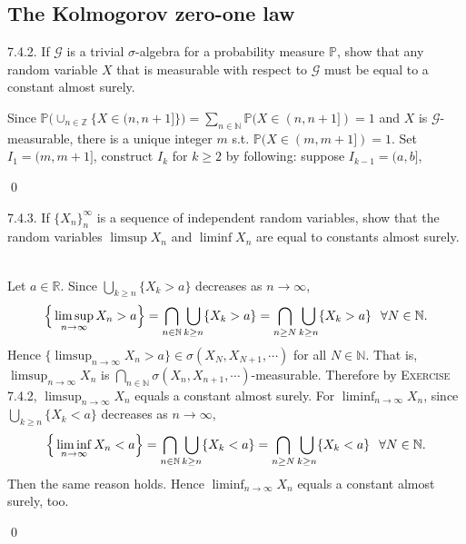 \subsection{The Kolmogorov zero-one law}
\begin{exercise}7.4.2.
If $\mathcal{G}$ is a trivial $\sigma$-algebra for a probability measure $\mathbb{P}$, show that any random variable $X$ that is measurable with respect to $\mathcal{G}$ must be equal to a constant almost surely.
\end{exercise} 
\begin{answer}Since $\mathbb{P}\big(\cup_{n\in\mathbb{Z}}\{X\in(n,n+1]\}\big)=\sum_{n\in\mathbb{N}}\mathbb{P}(X\in(n,n+1])=1$ and $X$ is $\mathcal{G}$-measurable, there is a unique integer $m$ s.t. $\mathbb{P}(X\in(m,m+1])=1$. Set $I_1=(m,m+1]$, construct $I_k$ for $k\geq 2$ by following: suppose $I_{k-1}=(a,b]$,  

\end{answer}\qed \qquad
\begin{exercise}7.4.3.
 If $\{ X_n\}_n^\infty$ is a sequence of independent random variables, show that the random variables $\limsup X_n$ and $\liminf X_n$ are equal to constants almost surely.
\end{exercise}
\begin{answer} \\
Let $a\in\mathbb{R}$. Since $\bigcup_{k\geq n}\{X_k>a\}$ decreases as $n\rightarrow\infty$,
\begin{equation*}
    \begin{aligned}
        \Big\{\limsup_{n\rightarrow\infty}X_n>a\Big\}=\bigcap_{n\in\mathbb{N}}\bigcup_{k\geq n}\{X_k>a\}=\bigcap_{n\geq N}\bigcup_{k\geq n}\{X_k>a\}\hspace{0.25cm}\forall N\in\mathbb{N}.
    \end{aligned}
\end{equation*}
Hence $\{\limsup_{n\rightarrow\infty}X_n>a\}\in\sigma(X_N,X_{N+1},\cdots)$ for all $N\in\mathbb{N}$. That is, $\limsup_{n\rightarrow\infty}X_n$ is $\bigcap_{n\in\mathbb{N}}\sigma(X_n,X_{n+1},\cdots)$-measurable. Therefore by \textsc{Exercise 7.4.2}, $\limsup_{n\rightarrow\infty}X_n$ equals a constant almost surely. For $\liminf_{n\rightarrow\infty}X_n$, since $\bigcup_{k\geq n}\{X_k<a\}$ decreases as $n\rightarrow\infty$,
\begin{equation*}
    \Big\{\liminf_{n\rightarrow\infty}X_n<a\Big\}=\bigcap_{n\in\mathbb{N}}\bigcup_{k\geq n}\{X_k<a\}=\bigcap_{n\geq N}\bigcup_{k\geq n}\{X_k<a\}\hspace{0.25cm}\forall N\in\mathbb{N}.
\end{equation*}
Then the same reason holds. Hence $\liminf_{n\rightarrow\infty}X_n$ equals a constant almost surely, too.
\end{answer}\qed\qquad


